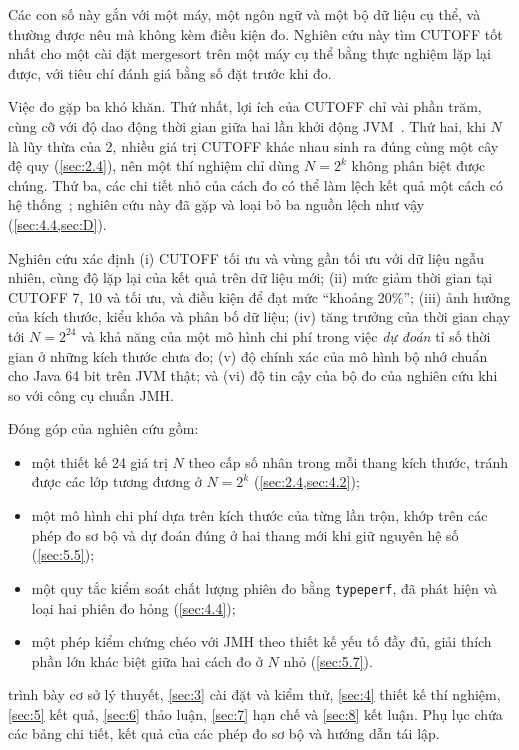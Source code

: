 \documentclass[12pt,a4paper]{article}
\begin{document}
Các con số này gắn với một máy, một ngôn ngữ và một bộ dữ liệu cụ thể, và thường được nêu mà không kèm điều kiện đo. Nghiên cứu này tìm CUTOFF tốt nhất cho một cài đặt mergesort trên một máy cụ thể bằng thực nghiệm lặp lại được, với tiêu chí đánh giá bằng số đặt trước khi đo.

Việc đo gặp ba khó khăn. Thứ nhất, lợi ích của CUTOFF chỉ vài phần trăm, cùng cỡ với độ dao động thời gian giữa hai lần khởi động JVM~\citep{georges2007}. Thứ hai, khi $N$ là lũy thừa của 2, nhiều giá trị CUTOFF khác nhau sinh ra đúng cùng một cây đệ quy (\cref{sec:2.4}), nên một thí nghiệm chỉ dùng $N = 2^k$ không phân biệt được chúng. Thứ ba, các chi tiết nhỏ của cách đo có thể làm lệch kết quả một cách có hệ thống~\citep{mytkowicz2009}; nghiên cứu này đã gặp và loại bỏ ba nguồn lệch như vậy (\cref{sec:4.4,sec:D}).

Nghiên cứu xác định (i) CUTOFF tối ưu và vùng gần tối ưu với dữ liệu ngẫu nhiên, cùng độ lặp lại của kết quả trên dữ liệu mới; (ii) mức giảm thời gian tại CUTOFF 7, 10 và tối ưu, và điều kiện để đạt mức ``khoảng 20\%''; (iii) ảnh hưởng của kích thước, kiểu khóa và phân bố dữ liệu; (iv) tăng trưởng của thời gian chạy tới $N = 2^{24}$ và khả năng của một mô hình chi phí trong việc \emph{dự đoán} tỉ số thời gian ở những kích thước chưa đo; (v) độ chính xác của mô hình bộ nhớ chuẩn cho Java 64 bit trên JVM thật; và (vi) độ tin cậy của bộ đo của nghiên cứu khi so với công cụ chuẩn JMH.

Đóng góp của nghiên cứu gồm:
\begin{itemize}
\item một thiết kế 24 giá trị $N$ theo cấp số nhân trong mỗi thang kích thước, tránh được các lớp tương đương ở $N = 2^k$ (\cref{sec:2.4,sec:4.2});
\item một mô hình chi phí dựa trên kích thước của từng lần trộn, khớp trên các phép đo sơ bộ và dự đoán đúng ở hai thang mới khi giữ nguyên hệ số (\cref{sec:5.5});
\item một quy tắc kiểm soát chất lượng phiên đo bằng \texttt{typeperf}, đã phát hiện và loại hai phiên đo hỏng (\cref{sec:4.4});
\item một phép kiểm chứng chéo với JMH theo thiết kế yếu tố đầy đủ, giải thích phần lớn khác biệt giữa hai cách đo ở $N$ nhỏ (\cref{sec:5.7}).
\end{itemize}

 trình bày cơ sở lý thuyết, \cref{sec:3} cài đặt và kiểm thử, \cref{sec:4} thiết kế thí nghiệm, \cref{sec:5} kết quả, \cref{sec:6} thảo luận, \cref{sec:7} hạn chế và \cref{sec:8} kết luận. Phụ lục chứa các bảng chi tiết, kết quả của các phép đo sơ bộ và hướng dẫn tái lập.
\end{document}
